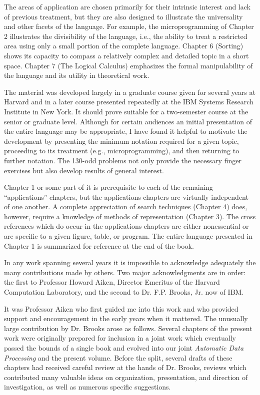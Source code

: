 \par The areas of application are chosen primarily for their intrinsic interest and lack of previous treatment, but they are also designed to illustrate the universality and other facets of the language. For example, the microprogramming of Chapter 2 illustrates the divisibility of the language, i.e., the ability to treat a restricted area using only a small portion of the complete language. Chapter 6 (Sorting) shows its capacity to compass a relatively complex and detailed topic in a short space. Chapter 7 (The Logical Calculus) emphasizes the formal manipulability of the language and its utility in theoretical work.

\par The material was developed largely in a graduate course given for several years at Harvard and in a later course presented repeatedly at the IBM Systems Research Institute in New York. It should prove suitable for a two-semester course at the senior or graduate level. Although for certain audiences an initial presentation of the entire language may be appropriate, I have found it helpful to motivate the development by presenting the minimum notation required for a given topic, proceeding to its treatment (e.g., microprogramming), and then returning to further notation. The 130-odd problems not only provide the necessary finger exercises but also develop results of general interest.

\par Chapter 1 or some part of it is prerequisite to each of the remaining ``applications'' chapters, but the applications chapters are virtually independent of one another. A complete appreciation of search techniques (Chapter 4) does, however, require a knowledge of methods of representation (Chapter 3). The cross references which do occur in the applications chapters are either nonessential or are specific to a given figure, table, or program. The entire language presented in Chapter 1 is summarized for reference at the end of the book.

\par In any work spanning several years it is impossible to acknowledge adequately the many contributions made by others. Two major acknowledgments are in order: the first to Professor Howard Aiken, Director Emeritus of the Harvard Computation Laboratory, and the second to Dr. F.P. Brooks, Jr. now of IBM.

\par It was Professor Aiken who first guided me into this work and who provided support and encouragement in the early years when it mattered. The unusually large contribution by Dr. Brooks arose as follows. Several chapters of the present work were originally prepared for inclusion in a joint work which eventually passed the bounds of a single book and evolved into our joint \textit{Automatic Data Processing} and the present volume. Before the split, several drafts of these chapters had received careful review at the hands of Dr. Brooks, reviews which contributed many valuable ideas on organization, presentation, and direction of investigation, as well as numerous specific suggestions.


